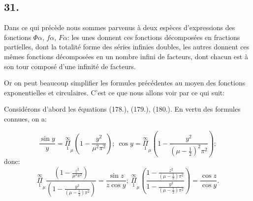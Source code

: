 \documentclass{article}
\begin{document}
\subsection*{31.}

Dans ce qui précède nous sommes parvenus à deux espèces d'expressions des fonctions $\Phi\alpha$, $f\alpha$, $F\alpha$: les unes donnent ces fonctions décomposées en fractions partielles, dont la totalité forme des séries infinies doubles, les autres donnent ces mêmes fonctions décomposées en un nombre infini de facteurs, dont chacun est à son tour composé d'une infinité de facteurs.

Or on peut beaucoup simplifier les formules précédentes au moyen des fonctions exponentielles et circulaires. C'est ce que nous allons voir par ce qui suit:

Considérons d'abord les équations (178.), (179.), (180.). En vertu des formules connues, on a:

\[
\frac{\sin y}{y} = \overset{\infty}{\underset{1}{\Pi}}_{\mu}\left(1-\frac{y^{2}}{\mu^{2}\pi^{2}}\right);\ \cos y = \overset{\infty}{\underset{1}{\Pi}}_{\mu}\left(1-\frac{y^{2}}{(\mu-\tfrac{1}{2})^{2}\pi^{2}}\right);
\]
donc:
\[
\overset{\infty}{\underset{1}{\Pi}}_{\mu}\frac{\left(1-\frac{z^{2}}{\mu^{2}\pi^{2}}\right)}{\left(1-\frac{y^{2}}{(\mu-\tfrac{1}{2})\pi^{2}}\right)} = \frac{\sin z}{z\cos y};\ \overset{\infty}{\underset{1}{\Pi}}_{\mu}\left(\frac{1-\frac{z^{2}}{(\mu-\tfrac{1}{2})\pi^{2}}}{1-\frac{y^{2}}{(\mu-\tfrac{1}{2})\pi^{2}}}\right) = \frac{\cos z}{\cos y}.
\]
\end{document}
